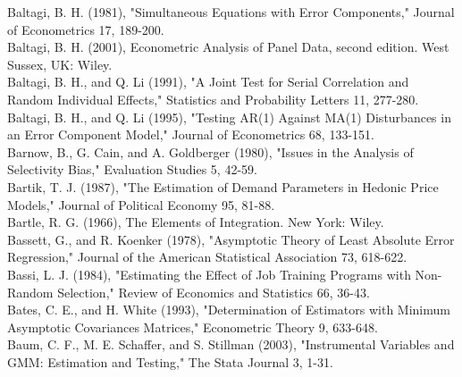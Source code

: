 \documentclass[10pt]{article}
\begin{document}
Baltagi, B. H. (1981), "Simultaneous Equations with Error Components," Journal of Econometrics 17, 189-200.\\
Baltagi, B. H. (2001), Econometric Analysis of Panel Data, second edition. West Sussex, UK: Wiley.\\
Baltagi, B. H., and Q. Li (1991), "A Joint Test for Serial Correlation and Random Individual Effects," Statistics and Probability Letters 11, 277-280.\\
Baltagi, B. H., and Q. Li (1995), "Testing AR(1) Against MA(1) Disturbances in an Error Component Model," Journal of Econometrics 68, 133-151.\\
Barnow, B., G. Cain, and A. Goldberger (1980), "Issues in the Analysis of Selectivity Bias," Evaluation Studies 5, 42-59.\\
Bartik, T. J. (1987), "The Estimation of Demand Parameters in Hedonic Price Models," Journal of Political Economy 95, 81-88.\\
Bartle, R. G. (1966), The Elements of Integration. New York: Wiley.\\
Bassett, G., and R. Koenker (1978), "Asymptotic Theory of Least Absolute Error Regression," Journal of the American Statistical Association 73, 618-622.\\
Bassi, L. J. (1984), "Estimating the Effect of Job Training Programs with Non-Random Selection," Review of Economics and Statistics 66, 36-43.\\
Bates, C. E., and H. White (1993), "Determination of Estimators with Minimum Asymptotic Covariances Matrices," Econometric Theory 9, 633-648.\\
Baum, C. F., M. E. Schaffer, and S. Stillman (2003), "Instrumental Variables and GMM: Estimation and Testing," The Stata Journal 3, 1-31.
\end{document}
